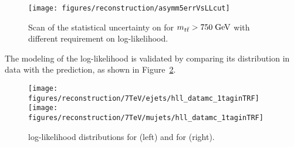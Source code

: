 \begin{figure}[!htb]\centering
  \texttt{[image: figures/reconstruction/asymm5errVsLLcut]}
  \caption{
    \label{fig:errvsllcut}
    Scan of the statistical uncertainty on \ac{} for $\mbox{$m_{t\bar{t}}$}{}>750\; \mathrm{GeV}{}$
    with different requirement on log-likelihood.
  }
\end{figure}

The modeling of the log-likelihood is validated by comparing its
distribution in data with the prediction, as shown in Figure~\ref{fig:logl}.

\begin{figure}[!htb]\centering
  \texttt{[image: figures/reconstruction/7TeV/ejets/hll\_datamc\_1taginTRF]}
  \texttt{[image: figures/reconstruction/7TeV/mujets/hll\_datamc\_1taginTRF]}                                                                            
  \caption{
    \label{fig:logl}
    log-likelihood distributions for \ejets{} (left) and
    for \mujets{} (right).
    }
\end{figure}

